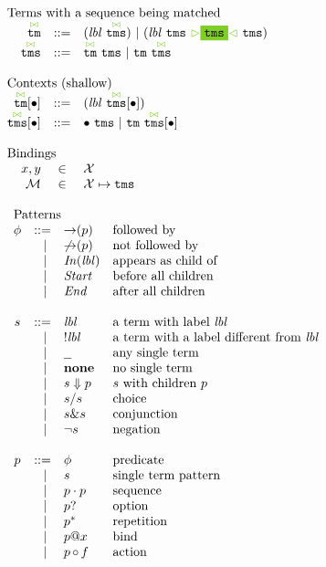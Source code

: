 \documentclass{article}
\makeatletter
\newcommand{\cursorColor}{LimeGreen}
\newcommand{\lbl}{\ensuremath{\mathit{lbl}}}
\newcommand{\tm}{\ensuremath{\mathtt{tm}}}
\newcommand{\tms}{\ensuremath{\mathtt{tms}}}
\newcommand{\Tmc}{\ensuremath{\overset{ \textcolor{\cursorColor}{\bowtie}}{\tm}}}
\newcommand{\Tmcs}{\ensuremath{\overset{\textcolor{\cursorColor}{\bowtie}}{\tms}}}
\newcommand{\mstart}{\ensuremath{\textcolor{\cursorColor}{\rhd}}}
\newcommand{\mend}{\ensuremath{\textcolor{\cursorColor}{\lhd}}}
\newcommand{\bindings}{\ensuremath{\mathcal{M}}}
\newcommand{\select}[1]{\mstart\colorbox{\cursorColor}{$#1$}\mend}
\newcommand{\pseq}[2]{\ensuremath{#1 \cdot #2}}
\newcommand{\por}[2]{\ensuremath{#1/#2}}
\newcommand{\pand}[2]{\ensuremath{#1\&#2}}
\newcommand{\children}[2]{\ensuremath{#1} \Downarrow #2}
\newcommand{\pnot}[1]{\ensuremath{\lnot #1}}
\newcommand{\maybe}[1]{\ensuremath{#1?}}
\newcommand{\many}[1]{\ensuremath{#1^*}}
\newcommand{\any}{\ensuremath{\text{\underline{\hspace{0.6em}}}}}
\newcommand{\none}{\ensuremath{\mathbf{none}}}
\newcommand{\bind}[2]{\ensuremath{#1@#2}}
\newcommand{\paction}[2]{\ensuremath{#1\mathop{\circ} #2}}
\newcommand{\fb}[1]{\ensuremath{\mathop{\rightarrow}(#1)}}
\newcommand{\nfb}[1]{\ensuremath{\mathop{\not\rightarrow}(#1)}}
\newcommand{\pin}[1]{\ensuremath{\mathit{In}(#1)}}
\newcommand{\pstart}{\ensuremath{\mathit{Start}}}
\newcommand{\pend}{\ensuremath{\mathit{End}}}
\newcommand{\arrayheading}[2]{\multicolumn{#1}{l}{\mbox{#2}}}
\makeatother
\begin{document}
\[
  \begin{array}{rcl}
    \arrayheading{3}{Terms with a sequence being matched}\\
    \Tmc & ::= & (\lbl~\Tmcs) ~|~ (\lbl~\tms~\select{\tms}~\tms)\\
    \Tmcs & ::= & \Tmc ~ \tms ~|~ \tm ~ \Tmcs\\
    \\
    \arrayheading{3}{Contexts (shallow)}\\
    \Tmc[\bullet] & ::= & (\lbl~\Tmcs[\bullet])\\
    \Tmcs[\bullet] & ::= & \bullet ~ \tms ~|~ \tm ~ \Tmcs[\bullet]\\
    \\
    \arrayheading{3}{Bindings}\\
    x, y      & \in & \mathcal{X}\\
    \bindings & \in & \mathcal{X} \mapsto \tms\\
    \\
    \multicolumn{3}{l}{
    \begin{array}{crll}
      \arrayheading{4}{Patterns}\\
      \phi & ::= & \fb{p} & \text{followed by}\\
           & ~|~ & \nfb{p} & \text{not followed by}\\
           & ~|~ & \pin{\lbl} & \text{appears as child of}\\
           & ~|~ & \pstart{} & \text{before all children}\\
           & ~|~ & \pend{} & \text{after all children}\\
      \\
      s & ::= & \lbl & \text{a term with label $\lbl$}\\
        & ~|~ & !\lbl & \text{a term with a label different from $\lbl$}\\
        & ~|~ & \any{} & \text{any single term}\\
        & ~|~ & \none{} & \text{no single term}\\
        & ~|~ & \children{s}{p} & \text{$s$ with children $p$}\\
        & ~|~ & \por{s}{s} & \text{choice}\\
        & ~|~ & \pand{s}{s} & \text{conjunction}\\
        & ~|~ & \pnot{s} & \text{negation}\\
      \\
      p & ::= & \phi & \text{predicate}\\
        & ~|~ & s & \text{single term pattern}\\
        & ~|~ & \pseq{p}{p} & \text{sequence}\\
        & ~|~ & \maybe{p} & \text{option}\\
        & ~|~ & \many{p} & \text{repetition}\\
        & ~|~ & \bind{p}{x} & \text{bind}\\
        & ~|~ & \paction{p}{f} & \text{action}\\
    \end{array}
    }
  \end{array}
\]
\end{document}
